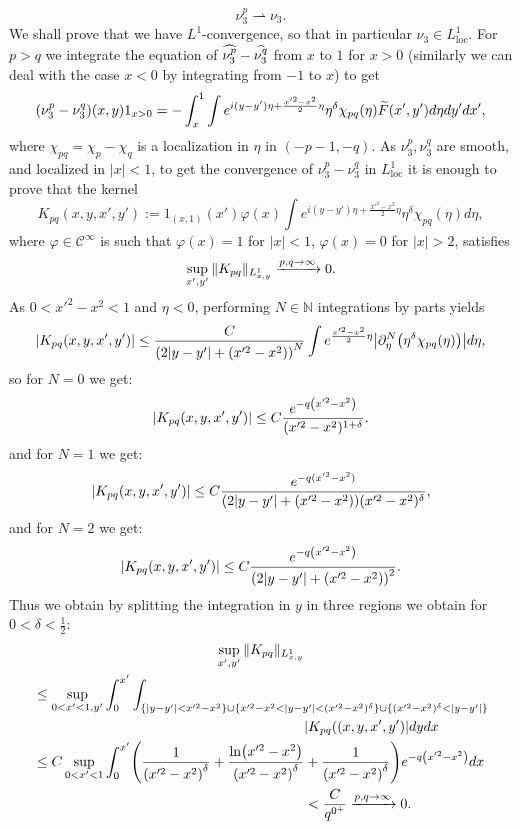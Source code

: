 \documentclass[AHL,Unicode,longabstracts,published]{cedram}
\DeclareMathOperator{\locc}{loc}
\newcommand{\bbN}{\mathbb{N}}
\newcommand{\clC}{\mathcal{C}}
\renewcommand*{\to}{\mathchoice{\longrightarrow}{\rightarrow}{\rightarrow}{\rightarrow}}
\let\originalleft\left
\let\originalright\right
\renewcommand{\left}{\mathopen{}\mathclose\bgroup\originalleft}
\renewcommand{\right}{\aftergroup\egroup\originalright}
\let\oldtilde\tilde
\renewcommand*{\tilde}[1]{\mathchoice{\widetilde{#1}}{\widetilde{#1}}{\oldtilde{#1}}{\oldtilde{#1}}}
\let\oldhat\hat
\renewcommand*{\hat}[1]{\mathchoice{\widehat{#1}}{\widehat{#1}}{\oldhat{#1}}{\oldhat{#1}}}
\begin{document}
\[
\nu_3^p\rightharpoonup\nu_3.
\]
We shall prove that we have $L^1$-convergence, so that in particular $\nu_3\in L^1_{\locc}$. For $p>q$ we integrate the equation of $\hat{\nu_3^p}-\hat{\nu_3^q}$ from $x$ to $1$ for $x>0$ (similarly we can deal with the case $x<0$ by integrating from $-1$ to $x$) to get
\[
\left(\nu_3^p-\nu_3^q\right)(x,y)1_{x>0}=-\int_x^1\int e^{i(y-y')\eta+\frac {x'^2-x^2}2\eta}\eta^\delta \chi_{pq}(\eta)\tilde F(x',y')d\eta dy'dx',
\]
where $\chi_{pq}=\chi_p-\chi_q$ is a localization in $\eta$ in $(-p-1,-q)$. As $\nu_3^p,\nu_3^q$ are smooth, and localized in $|x|<1$, to get the convergence of $\nu_3^p-\nu_3^q$ in $L^1_{\locc}$ it is enough to prove that the kernel
\[
K_{pq}(x,y,x',y'):=1_{(x,1)}(x')\varphi(x)\int e^{i(y-y')\eta+\frac {x'^2-x^2}2\eta}\eta^\delta\chi_{pq}(\eta)d\eta,
\]
where $\varphi\in\clC^\infty$ is such that $\varphi(x)=1$ for $|x|<1$, $\varphi(x)=0$ for $|x|>2$, satisfies
\[
\sup_{x',y'}\|K_{pq}\|_{L^1_{x,y}}\xrightarrow{p,q\to\infty} 0.
\]
As $0<x'^2-x^2<1$ and $\eta<0$, performing $N\in\bbN$ integrations by parts yields
\[
\left|K_{pq}(x,y,x',y')\right|\leq \frac{C}{\left(2|y-y'|+(x'^2-x^2)\right)^N}\int e^{\frac {x'^2-x^2}2\eta}\left|\partial_\eta^N\left(\eta^\delta\chi_{pq}(\eta)\right)\right|d\eta,
\]
so for $N=0$ we get:
\[
\left|K_{pq}(x,y,x',y')\right|\leq C\frac{e^{-q\left(x'^2-x^2\right)}}{(x'^2-x^2)^{1+\delta}}.
\]
and for $N=1$ we get:
\[
\left|K_{pq}\left(x,y,x',y'\right)\right|\leq C\frac{e^{-q(x'^2-x^2)}}{\left(2|y-y'|+(x'^2-x^2)\right)(x'^2-x^2)^{\delta}},
\]
and for $N=2$ we get:
\[
\left|K_{pq}(x,y,x',y')\right|\leq C\frac{e^{-q\left(x'^2-x^2\right)}}{\left(2|y-y'|+(x'^2-x^2)\right)^2}.
\]
Thus we obtain by splitting the integration in $y$ in three regions we obtain for $0<\delta<\frac 12$:
\begin{multline}
\sup_{x',y'}\|K_{pq}\|_{L^1_{x,y}}\\
\begin{aligned}
&\leq \sup_{0<x'< 1,y'}\int_0^{x'}\int_{\left\{|y-y'|<x'^2-x^2\right\}
\cup\left\{x'^2-x^2<|y-y'|<(x'^2-x^2)^{\delta}\right\}\cup \left\{(x'^2-x^2)^{\delta}<|y-y'|\right\}}\\
& \mkern350mu |K_{pq}((x,y,x',y')|dydx
\\
&\leq C\sup_{0<x'< 1}\int_0^{x'}\left(\frac{1}{\left(x'^2-x^2\right)^{\delta}}
+\frac{\ln \left(x'^2-x^2\right)}{\left(x'^2-x^2\right)^{\delta}}+\frac{1}{\left(x'^2-x^2\right)^{\delta}}\right)e^{-q\left(x'^2-x^2\right)}dx\\
& \mkern350mu
<\frac{C}{q^{0^+}}\xrightarrow{p,q\to\infty} 0.
\end{aligned}
\end{multline}
\end{document}
